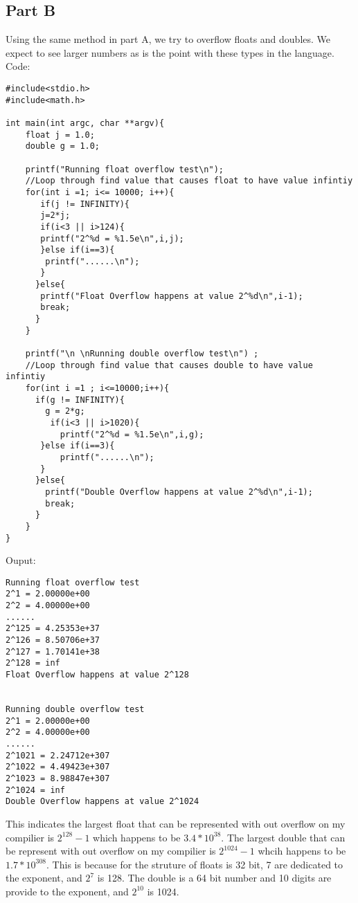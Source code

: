 \documentclass[12pt]{article}
\begin{document}
\subsection{Part B}
Using the same method in part A, we try to overflow floats and doubles. We expect to see larger numbers as is the point with these types in the language.
Code:
\begin{verbatim}
#include<stdio.h>
#include<math.h>

int main(int argc, char **argv){
    float j = 1.0;
    double g = 1.0;
    
    printf("Running float overflow test\n");
    //Loop through find value that causes float to have value infintiy
    for(int i =1; i<= 10000; i++){
       if(j != INFINITY){
       j=2*j;
       if(i<3 || i>124){
       printf("2^%d = %1.5e\n",i,j);
       }else if(i==3){
        printf("......\n");
       }
      }else{
       printf("Float Overflow happens at value 2^%d\n",i-1);
       break;
      }
    }
     
    printf("\n \nRunning double overflow test\n") ;
    //Loop through find value that causes double to have value infintiy
    for(int i =1 ; i<=10000;i++){
      if(g != INFINITY){
        g = 2*g;
         if(i<3 || i>1020){
           printf("2^%d = %1.5e\n",i,g);
       }else if(i==3){
           printf("......\n");
       }
      }else{
        printf("Double Overflow happens at value 2^%d\n",i-1);
        break;
      }
    }
}

\end{verbatim}
Ouput:
\begin{verbatim}
Running float overflow test
2^1 = 2.00000e+00
2^2 = 4.00000e+00
......
2^125 = 4.25353e+37
2^126 = 8.50706e+37
2^127 = 1.70141e+38
2^128 = inf
Float Overflow happens at value 2^128

 
Running double overflow test
2^1 = 2.00000e+00
2^2 = 4.00000e+00
......
2^1021 = 2.24712e+307
2^1022 = 4.49423e+307
2^1023 = 8.98847e+307
2^1024 = inf
Double Overflow happens at value 2^1024
\end{verbatim}
This indicates the largest float that can be represented with out overflow on my compilier is $2^{128} -1$ which happens to be $3.4*10^{38}$. The largest double that can be represent with out overflow on my compilier is $2^{1024}-1$ whcih happens to be $1.7 * 10^{308}$. This is because for the struture of floats is 32 bit, 7 are dedicated to the exponent, and $2^7$ is 128. The double is a 64 bit number and 10 digits are provide to the exponent, and $2^10$ is 1024.
\end{document}
